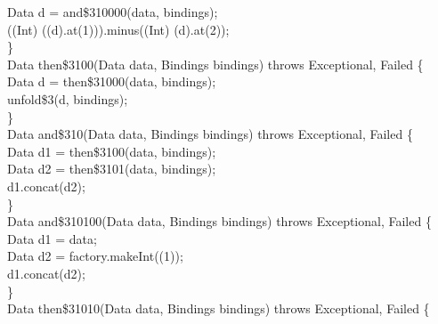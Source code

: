 \begin{flushleft}
\hspace*{8\indentation}Data d = and\$310000(data, bindings);\mbox{}\\
\hspace*{8\indentation}{\bf return} ((Int) ((d).at(1))).minus((Int) (d).at(2));\mbox{}\\
\hspace*{4\indentation}\}\mbox{}\\
\hspace*{4\indentation}{\bf private} Data then\$3100(Data data, Bindings bindings) throws Exceptional, Failed \{\mbox{}\\
\hspace*{8\indentation}Data d = then\$31000(data, bindings);\mbox{}\\
\hspace*{8\indentation}{\bf return} unfold\$3(d, bindings);\mbox{}\\
\hspace*{4\indentation}\}\mbox{}\\
\hspace*{4\indentation}{\bf private} Data and\$310(Data data, Bindings bindings) throws Exceptional, Failed \{\mbox{}\\
\hspace*{8\indentation}Data d1 = then\$3100(data, bindings);\mbox{}\\
\hspace*{8\indentation}Data d2 = then\$3101(data, bindings);\mbox{}\\
\hspace*{8\indentation}{\bf return} d1.concat(d2);\mbox{}\\
\hspace*{4\indentation}\}\mbox{}\\
\hspace*{4\indentation}{\bf private} Data and\$310100(Data data, Bindings bindings) throws Exceptional, Failed \{\mbox{}\\
\hspace*{8\indentation}Data d1 = data;\mbox{}\\
\hspace*{8\indentation}Data d2 = factory.makeInt((1));\mbox{}\\
\hspace*{8\indentation}{\bf return} d1.concat(d2);\mbox{}\\
\hspace*{4\indentation}\}\mbox{}\\
\hspace*{4\indentation}{\bf private} Data then\$31010(Data data, Bindings bindings) throws Exceptional, Failed \{\mbox{}\\

\end{flushleft}
